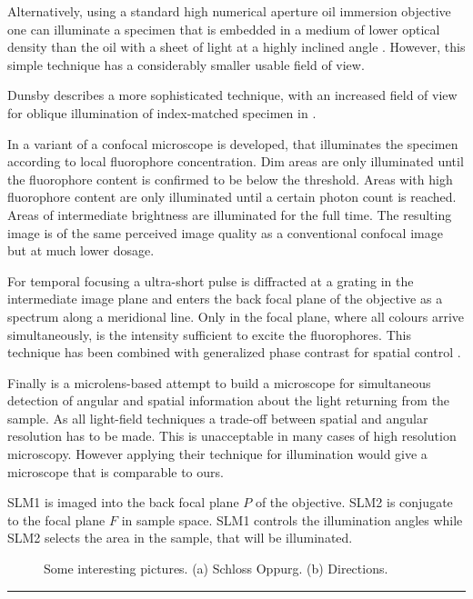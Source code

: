 \documentclass[a4paper, 11pt]{article}
\begin{document}
\begin{multicols}{2}
Alternatively, using a standard high numerical aperture oil immersion
objective one can illuminate a specimen that is embedded in a medium
of lower optical density than the oil with a sheet of light at a
highly inclined angle \cite{Tokunaga2008,Konopka2008}. However, this
simple technique has a considerably smaller usable field of view.

Dunsby describes a more sophisticated technique, with an increased
field of view for oblique illumination of index-matched specimen in
\cite{Dunsby2008}.

In \cite{Hoebe2007} a variant of a confocal microscope is developed,
that illuminates the specimen according to local fluorophore
concentration. Dim areas are only illuminated until the fluorophore
content is confirmed to be below the threshold. Areas with high
fluorophore content are only illuminated until a certain photon count
is reached. Areas of intermediate brightness are illuminated for the
full time. The resulting image is of the same perceived image quality
as a conventional confocal image but at much lower dosage.

For temporal focusing \cite{Oron2005} a ultra-short pulse is
diffracted at a grating in the intermediate image plane and enters the
back focal plane of the objective as a spectrum along a meridional
line. Only in the focal plane, where all colours arrive
simultaneously, is the intensity sufficient to excite the
fluorophores. This technique has been combined with generalized phase
contrast for spatial control \cite{Papagiakoumou2010}.

Finally \cite{Levoy2009} is a microlens-based attempt to build a
microscope for simultaneous detection of angular and spatial
information about the light returning from the sample. As all
light-field techniques a trade-off between spatial and angular
resolution has to be made. This is unacceptable in many cases of high
resolution microscopy. However applying their technique for
illumination would give a microscope that is comparable to ours.

 SLM1 is imaged into the back
focal plane $P$ of the objective. SLM2 is conjugate to the focal plane
$F$ in sample space.  SLM1 controls the illumination angles while SLM2
selects the area in the sample, that will be illuminated.

\begin{figure}[H]
{\scriptsize }
\caption{Some interesting pictures. (a) Schloss Oppurg. (b) Directions.}
\label{fig:figure1}
\end{figure}

\end{multicols}

\begin{center}
\rule{0.75\textwidth}{1pt}
\end{center}



\end{document}
